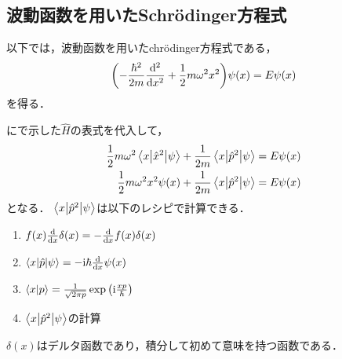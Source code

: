 \documentclass{report}
\begin{document}
  \subsection{波動函数を用いたSchr\"odinger方程式}
    以下では，波動函数を用いたchr\"odinger方程式である，
    \begin{align}
      \qty(-\frac{\hbar^2}{2m}\dv[2]{x} + \frac{1}{2}m\omega^2x^2)\psi(x) = E\psi(x)
    \end{align}
    を得る．
    \par
    にで示した$\hat{H}$の表式を代入して，
    \begin{align}
      \frac{1}{2}m\omega^2\mel**{x}{\hat{x}^2}{\psi} + \frac{1}{2m}\mel**{x}{\hat{p}^2}{\psi} &= E\psi(x) \\ 
      \frac{1}{2}m\omega^2x^2\psi(x) + \frac{1}{2m}\mel**{x}{\hat{p}^2}{\psi} &= E\psi(x) \label{input-to-schrodinger}
    \end{align}
    となる．
    $\mel**{x}{\hat{p}^2}{\psi}$は以下のレシピで計算できる．
    \begin{enumerate}
      \item $f(x)\dv{x}\delta(x) = -\dv{x}f(x)\delta(x)$
      \item $\mel**{x}{\hat{p}}{\psi} = -\mathrm{i}\hbar\dv{x}\psi(x)$
      \item $\braket{x}{p} = \frac{1}{\sqrt{2\pi p}}\exp\qty(\mathrm{i}\frac{xp}{\hbar})$
      \item $\mel**{x}{\hat{p}^2}{\psi}$の計算
    \end{enumerate}
    $\delta(x)$はデルタ函数であり，積分して初めて意味を持つ函数である．
\end{document}
